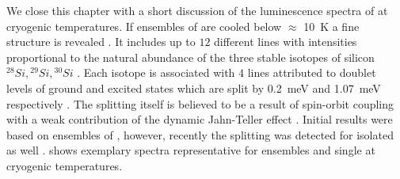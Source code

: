 



    We close this chapter with a short discussion of the luminescence spectra of \sivs at cryogenic temperatures.
    If ensembles of \sivs are cooled below $\approx$ \SI{10}{\kelvin} a fine structure is revealed \cite{neu2013low}. It includes up to $12$ different lines with intensities proportional to the natural abundance of the three stable isotopes of silicon ${}^{28}Si, {}^{29}Si, {}^{30}Si$ \cite{Clark1995}. Each isotope is associated with $4$ lines attributed to doublet levels of ground and excited states which are split by \SI{0.2}{\milli\eV} and \SI{1.07}{\milli\eV} respectively \cite{Rogers2014, Hepp2014, Clark1995}. The splitting itself is believed to be a result of spin-orbit coupling with a weak contribution of the dynamic Jahn-Teller effect \cite{Hepp2014}. Initial results were based on ensembles of \sivs, however, recently the splitting was detected for isolated \sivs as well \cite{Dietrich2014}.  shows exemplary spectra representative for ensembles and single \siv at cryogenic temperatures.

